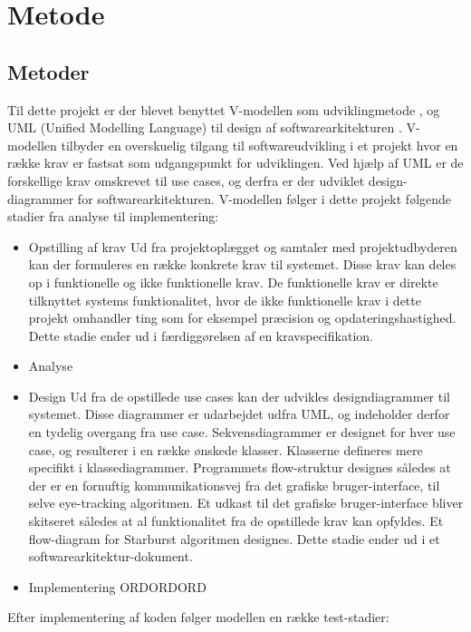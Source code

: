 \documentclass[rapport.tex]{subfiles}
\begin{document}
\section{Metode}
	\subsection{Metoder}
	Til dette projekt er der blevet benyttet V-modellen som udviklingmetode \cite{Vmodel}, og UML (Unified Modelling Language) \cite{UML} til design af softwarearkitekturen . V-modellen tilbyder en overskuelig tilgang til softwareudvikling i et projekt hvor en række krav er fastsat som udgangspunkt for udviklingen. Ved hjælp af UML er de forskellige krav omskrevet til use cases, og derfra er der udviklet design-diagrammer for softwarearkitekturen. 
	V-modellen følger i dette projekt følgende stadier fra analyse til implementering:
	\begin{itemize}
		\item Opstilling af krav
		\subitem Ud fra projektoplægget og samtaler med projektudbyderen kan der formuleres en række konkrete krav til systemet. Disse krav kan deles op i funktionelle og ikke funktionelle krav. De funktionelle krav er direkte tilknyttet systems funktionalitet, hvor de ikke funktionelle krav i dette projekt omhandler ting som for eksempel præcision og opdateringshastighed. Dette stadie ender ud i færdiggørelsen af en kravspecifikation. 
		\item Analyse
		\subitem
		\item Design
		\subitem Ud fra de opstillede use cases kan der udvikles designdiagrammer til systemet. Disse diagrammer er udarbejdet udfra UML, og indeholder derfor en tydelig overgang fra use case. Sekvensdiagrammer er designet for hver use case, og resulterer i en række ønskede klasser. Klasserne defineres mere specifikt i klassediagrammer. Programmets flow-struktur designes således at der er en fornuftig kommunikationsvej fra det grafiske bruger-interface, til selve eye-tracking algoritmen. Et udkast til det grafiske bruger-interface bliver skitseret således at al funktionalitet fra de opstillede krav kan opfyldes. Et flow-diagram for Starburst algoritmen designes. Dette stadie ender ud i et softwarearkitektur-dokument. 
		\item Implementering
		\subitem ORDORDORD
	\end{itemize}	
	Efter implementering af koden følger modellen en række test-stadier:
\end{document}
